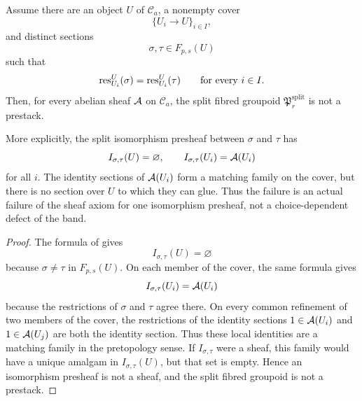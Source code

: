 \begin{proposition}\label{prop:nonseparated-pairs-obstruct-split}
Assume there are an object $U$ of $\mathcal C_a$, a nonempty cover
\[
\{U_i\to U\}_{i\in I},
\]
and distinct sections
\[
\sigma,\tau\in F_{p,s}(U)
\]
such that
\[
\mathrm{res}_{U_i}^{U}(\sigma)=\mathrm{res}_{U_i}^{U}(\tau)
\qquad\text{for every }i\in I.
\]
Then, for every abelian sheaf $\mathcal{A}$ on $\mathcal C_a$, the split fibred groupoid
$\mathfrak P_r^{\mathrm{split}}$ is not a prestack.

More explicitly, the split isomorphism presheaf between $\sigma$ and $\tau$ has
\[
I_{\sigma,\tau}(U)=\varnothing,
\qquad
I_{\sigma,\tau}(U_i)=\mathcal{A}(U_i)
\]
for all $i$. The identity sections of $\mathcal{A}(U_i)$ form a matching family on the
cover, but there is no section over $U$ to which they can glue. Thus the failure is
an actual failure of the sheaf axiom for one isomorphism presheaf, not a
choice-dependent defect of the band.
\end{proposition}

\begin{proof}
The formula of  gives
\[
I_{\sigma,\tau}(U)=\varnothing
\]
because $\sigma\neq\tau$ in $F_{p,s}(U)$. On each member of the cover, the same
formula gives
\[
I_{\sigma,\tau}(U_i)=\mathcal{A}(U_i)
\]
because the restrictions of $\sigma$ and $\tau$ agree there. On every common
refinement of two members of the cover, the restrictions of the identity
sections $1\in \mathcal{A}(U_i)$ and $1\in\mathcal{A}(U_j)$ are both the identity section.
Thus these local identities are a matching family in the pretopology sense.
If $I_{\sigma,\tau}$ were a sheaf, this family would have a unique amalgam in
$I_{\sigma,\tau}(U)$, but that set is empty. Hence an isomorphism presheaf is not
a sheaf, and the split fibred groupoid is not a prestack.
\end{proof}

